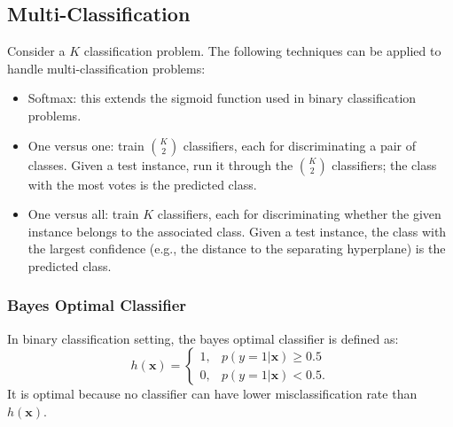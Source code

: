 {        \subsection{Multi-Classification}
            Consider a $K$ classification problem.
            The following techniques can be applied to handle multi-classification problems:
            \begin{itemize}
                \item Softmax: this extends the sigmoid function used in binary classification problems.
                \item One versus one: train  $\binom{K}{2}$ classifiers, each for discriminating a pair of classes.
                Given a test instance, run it through the $\binom{K}{2}$ classifiers; the class with the most votes is the predicted class.
                \item One versus all: train $K$ classifiers, each for discriminating whether the given instance belongs to the associated class.
                Given a test instance, the class with the largest confidence (e.g., the distance to the separating hyperplane) is the predicted class.
            \end{itemize}
            
        \subsubsection{Bayes Optimal Classifier}
            In binary classification setting, the bayes optimal classifier is defined as:
                \begin{equation}
                    h(\bm{x}) = \begin{cases} 1, & p(y=1 | \bm{x}) \ge 0.5 \\
                                              0, & p(y=1 | \bm{x}) < 0.5.
                    \end{cases}
                \end{equation}      
            It is optimal because no classifier can have lower misclassification rate than $h(\bm{x})$.
}
